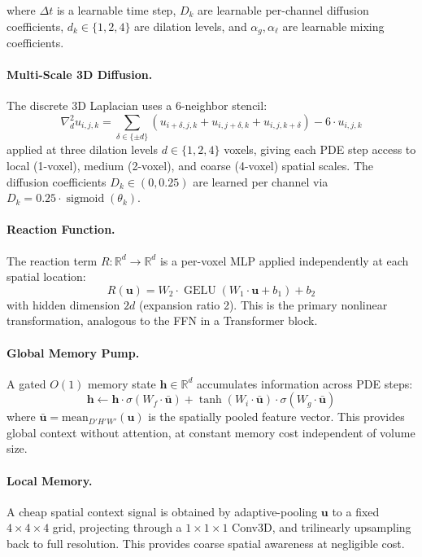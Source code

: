 \documentclass{article}
\newcommand{\R}{\mathbb{R}}
\newcommand{\lapl}{\nabla^2}
\DeclareMathOperator{\sigmoid}{sigmoid}
\DeclareMathOperator{\gelu}{GELU}
\begin{document}
where $\Delta t$ is a learnable time step, $D_k$ are learnable per-channel diffusion coefficients, $d_k \in \{1, 2, 4\}$ are dilation levels, and $\alpha_g, \alpha_\ell$ are learnable mixing coefficients.

\paragraph{Multi-Scale 3D Diffusion.}
The discrete 3D Laplacian uses a 6-neighbor stencil:
\begin{equation}
\lapl_{d} u_{i,j,k} = \sum_{\delta \in \{\pm d\}} \left(u_{i+\delta,j,k} + u_{i,j+\delta,k} + u_{i,j,k+\delta}\right) - 6 \cdot u_{i,j,k}
\end{equation}
applied at three dilation levels $d \in \{1, 2, 4\}$ voxels, giving each PDE step access to local (1-voxel), medium (2-voxel), and coarse (4-voxel) spatial scales. The diffusion coefficients $D_k \in (0, 0.25)$ are learned per channel via $D_k = 0.25 \cdot \sigmoid(\theta_k)$.

\paragraph{Reaction Function.}
The reaction term $R: \R^d \to \R^d$ is a per-voxel MLP applied independently at each spatial location:
\begin{equation}
R(\mathbf{u}) = W_2 \cdot \gelu(W_1 \cdot \mathbf{u} + b_1) + b_2
\end{equation}
with hidden dimension $2d$ (expansion ratio 2). This is the primary nonlinear transformation, analogous to the FFN in a Transformer block.

\paragraph{Global Memory Pump.}
A gated $O(1)$ memory state $\mathbf{h} \in \R^{d}$ accumulates information across PDE steps:
\begin{equation}
\mathbf{h} \leftarrow \mathbf{h} \cdot \sigma(W_f \cdot \bar{\mathbf{u}}) + \tanh(W_i \cdot \bar{\mathbf{u}}) \cdot \sigma(W_g \cdot \bar{\mathbf{u}})
\end{equation}
where $\bar{\mathbf{u}} = \text{mean}_{D'H'W'}(\mathbf{u})$ is the spatially pooled feature vector. This provides global context without attention, at constant memory cost independent of volume size.

\paragraph{Local Memory.}
A cheap spatial context signal is obtained by adaptive-pooling $\mathbf{u}$ to a fixed $4 \times 4 \times 4$ grid, projecting through a $1 \times 1 \times 1$ Conv3D, and trilinearly upsampling back to full resolution. This provides coarse spatial awareness at negligible cost.
\end{document}
